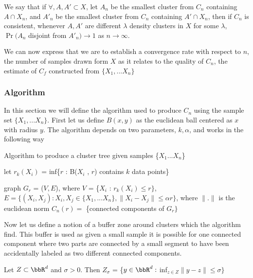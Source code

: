 \begin{definition}[Consistency]
 We say that if $\forall, A, A' \subset X$, let $A_n$ be the smallest cluster from $C_n$ containing $A \cap X_n$, and $A'_n$ be the smallest cluster from $C_n$ containing $A' \cap X_n$, then if $C_n$ is consistent, whenever $A, A'$ are different $\lambda$ density clusters in $X$ for some $\lambda$, $\Pr(A_n$ disjoint from $A'_n) \rightarrow 1$ as $n \rightarrow \infty$.  
 \end{definition}

 We can now express that we are to establish a convergence rate with respect to $n$, the number of samples drawn form $X$ as it relates to the quality of $C_n$, the estimate of $C_f$ constructed from $\{X_1, ... X_n\}$


\subsubsection{Algorithm}
In this section we will define the algorithm used to produce $C_n$ using the sample set $\{X_1, ... X_n\}$.  First let us define $B(x,y)$ as the euclidean ball centered as $x$ with radius $y$. The algorithm depends on two parameters, $k ,\alpha$, and works in the following way
\begin{algorithm}[H]
\caption {Algorithm to produce a cluster tree given samples \{$X_1 ... X_n$\}}
\begin{algorithmic}
  \STATE let $r_k(X_i)$ = inf\{$r$ : B($X_i$
, $r$) contains $k$ data points\}
\ENDFOR
{}

    \STATE graph $G_r$ = ($V,E$), where $V$ =  \{$X_i$
: $r_k(X_i) \leq r\}$, $E = \{(X_i, X_j): X_i, X_j \in \{X_1,...X_n\}, \|X_i -X_j \| \leq \alpha r\}$, where $\|.\|$ is the euclidean norm
    \STATE $C_n(r) =$ \{connected components of $G_r\}$
\ENDFOR
\end{algorithmic}
\end{algorithm}

Now let us define a notion of a buffer zone around clusters which the algorithm find.  This buffer is used as given a small sample it is possible for one connected component where two parts are connected by a small segment to have been accidentally labeled as two different connected components.  

\vspace{\baselineskip}
\begin{definition}[$Z_{\sigma}$]
Let $Z \subset \bbR^d$ and $\sigma > 0$.  Then $Z_{\sigma}$ = \{$y \in \bbR^d :$ inf$_{z \in Z}\|y-z\| \leq \sigma\}$
\end{definition}
\vspace{\baselineskip}

